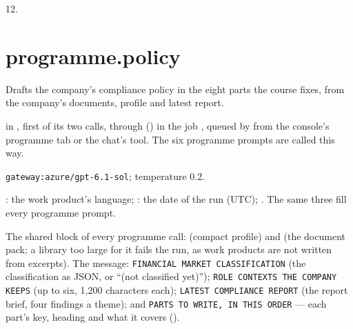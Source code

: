  12.


\section{programme.policy}\label{sec:aprompts:programme-policy}

 Drafts the company's compliance policy in the eight parts the course
fixes, from the company's documents, profile and latest report.

  in , first of its two
calls, through  () in the job ,
queued by  from the console's programme tab or the
chat's  tool. The six programme prompts are called this way.

 \texttt{gateway:azure/gpt-6.1-sol}; temperature 0.2.

 : the work product's language; : the
date of the run (UTC); . The same three fill every programme prompt.

 The shared block of every programme call:
 (compact profile) and  (the document pack; a library too large
for it fails the run, as work products are not written from excerpts). The message:
\texttt{FINANCIAL MARKET CLASSIFICATION} (the classification as JSON, or \enquote{(not
classified yet)}); \texttt{ROLE CONTEXTS THE COMPANY KEEPS} (up to six,
1{,}200 characters each); \texttt{LATEST COMPLIANCE REPORT} (the report brief, four findings a
theme); and \texttt{PARTS TO WRITE, IN THIS ORDER} --- each part's key, heading and what it covers
().

